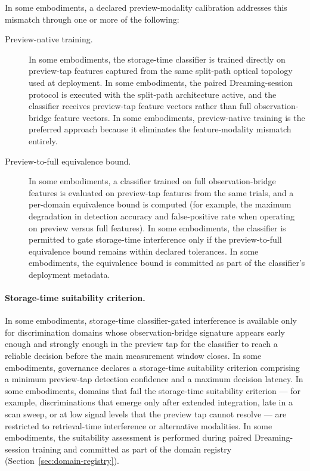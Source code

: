 \documentclass[a4paper,12pt]{article}
\begin{document}
In some embodiments, a declared preview-modality calibration
addresses this mismatch through one or more of the following:

\begin{description}
  \item[Preview-native training.] In some embodiments, the
    storage-time classifier is trained directly on preview-tap
    features captured from the same split-path optical topology used
    at deployment. In some embodiments, the paired Dreaming-session
    protocol is executed with the split-path architecture active, and
    the classifier receives preview-tap feature vectors rather than
    full observation-bridge feature vectors. In some embodiments,
    preview-native training is the preferred approach because it
    eliminates the feature-modality mismatch entirely.
  \item[Preview-to-full equivalence bound.] In some embodiments, a
    classifier trained on full observation-bridge features is
    evaluated on preview-tap features from the same trials, and a
    per-domain equivalence bound is computed (for example, the
    maximum degradation in detection accuracy and false-positive rate
    when operating on preview versus full features). In some
    embodiments, the classifier is permitted to gate storage-time
    interference only if the preview-to-full equivalence bound
    remains within declared tolerances. In some embodiments, the
    equivalence bound is committed as part of the classifier's
    deployment metadata.
\end{description}

\paragraph{Storage-time suitability criterion.}
In some embodiments, storage-time classifier-gated interference is
available only for discrimination domains whose observation-bridge
signature appears early enough and strongly enough in the preview
tap for the classifier to reach a reliable decision before the main
measurement window closes. In some embodiments, governance declares a
storage-time suitability criterion comprising a minimum preview-tap
detection confidence and a maximum decision latency. In some
embodiments, domains that fail the storage-time suitability criterion
--- for example, discriminations that emerge only after extended
integration, late in a scan sweep, or at low signal levels that
the preview tap cannot resolve --- are restricted to retrieval-time
interference or alternative modalities. In some embodiments, the
suitability assessment is performed during paired Dreaming-session
training and committed as part of the domain registry
(Section~\ref{sec:domain-registry}).
\end{document}
